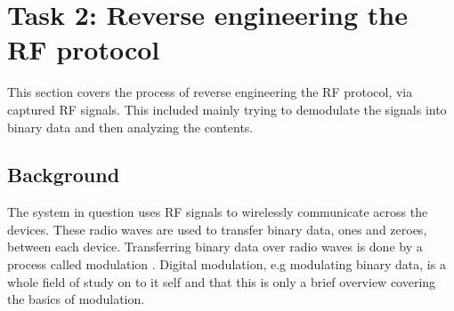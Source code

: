 \section{Task 2: Reverse engineering the RF protocol} \label{ch:pentesting:rf-reverse-engineering}
This section covers the process of reverse engineering the RF protocol, via captured RF signals. This included mainly trying to demodulate the signals into binary data and then analyzing the contents.

\subsection{Background}
The system in question uses RF signals to wirelessly communicate across the devices. These radio waves are used to transfer binary data, ones and zeroes, between each device. Transferring binary data over radio waves is done by a process called modulation \cite{rf-modulation}. Digital modulation, e.g modulating binary data, is a whole field of study on to it self and that this is only a brief overview covering the basics of modulation.


